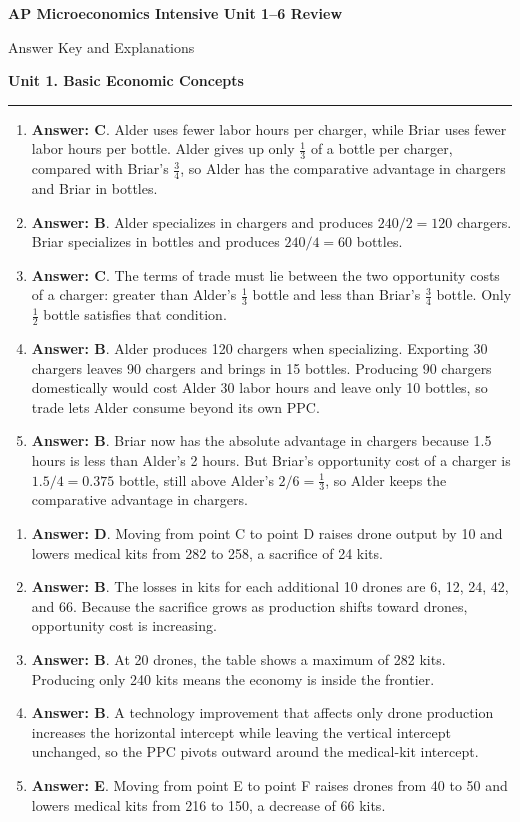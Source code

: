 \documentclass[10pt]{article}
\newcommand{\unitheader}[2]{%
  \vspace{0.35em}
  {\Large\bfseries Unit #1. #2\par}
  \vspace{0.2em}
  \hrule
  \vspace{0.55em}
}
\newcommand{\CodexWatermark}{%
  \AddToShipoutPictureBG{%
    \AtPageCenter{%
      \makebox(0,0){%
        \rotatebox{45}{%
          \textcolor[gray]{0.92}{\fontsize{22}{22}\selectfont\bfseries Winston Huang-Generated with Codex}%
        }%
      }%
    }%
  }%
}
\begin{document}
\CodexWatermark
{\centering
{\LARGE\bfseries AP Microeconomics Intensive Unit 1--6 Review\par}
\vspace{0.4em}
{\large Answer Key and Explanations\par}
\vspace{0.9em}}
\unitheader{1}{Basic Economic Concepts}
\begin{enumerate}[series=aps, leftmargin=*, itemsep=0.6em, topsep=0.2em, parsep=0pt]
\item \textbf{Answer: C}. Alder uses fewer labor hours per charger, while Briar uses fewer labor hours per bottle. Alder gives up only $\tfrac{1}{3}$ of a bottle per charger, compared with Briar's $\tfrac{3}{4}$, so Alder has the comparative advantage in chargers and Briar in bottles.
\item \textbf{Answer: B}. Alder specializes in chargers and produces $240/2=120$ chargers. Briar specializes in bottles and produces $240/4=60$ bottles.
\item \textbf{Answer: C}. The terms of trade must lie between the two opportunity costs of a charger: greater than Alder's $\tfrac{1}{3}$ bottle and less than Briar's $\tfrac{3}{4}$ bottle. Only $\tfrac{1}{2}$ bottle satisfies that condition.
\item \textbf{Answer: B}. Alder produces 120 chargers when specializing. Exporting 30 chargers leaves 90 chargers and brings in 15 bottles. Producing 90 chargers domestically would cost Alder 30 labor hours and leave only 10 bottles, so trade lets Alder consume beyond its own PPC.
\item \textbf{Answer: B}. Briar now has the absolute advantage in chargers because 1.5 hours is less than Alder's 2 hours. But Briar's opportunity cost of a charger is $1.5/4=0.375$ bottle, still above Alder's $2/6=\tfrac{1}{3}$, so Alder keeps the comparative advantage in chargers.
\end{enumerate}
\begin{enumerate}[resume*=aps, leftmargin=*, itemsep=0.6em, topsep=0.2em, parsep=0pt]
\item \textbf{Answer: D}. Moving from point C to point D raises drone output by 10 and lowers medical kits from 282 to 258, a sacrifice of 24 kits.
\item \textbf{Answer: B}. The losses in kits for each additional 10 drones are 6, 12, 24, 42, and 66. Because the sacrifice grows as production shifts toward drones, opportunity cost is increasing.
\item \textbf{Answer: B}. At 20 drones, the table shows a maximum of 282 kits. Producing only 240 kits means the economy is inside the frontier.
\item \textbf{Answer: B}. A technology improvement that affects only drone production increases the horizontal intercept while leaving the vertical intercept unchanged, so the PPC pivots outward around the medical-kit intercept.
\item \textbf{Answer: E}. Moving from point E to point F raises drones from 40 to 50 and lowers medical kits from 216 to 150, a decrease of 66 kits.
\end{enumerate}
\end{document}
